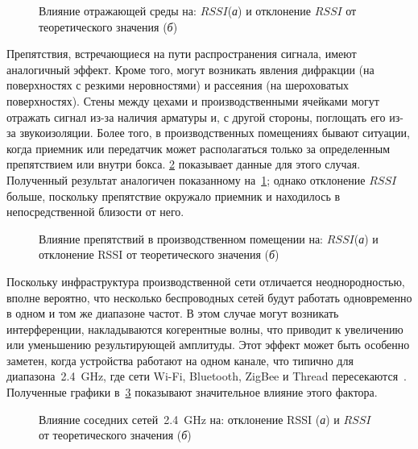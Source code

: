 \begin{figure} [tb]
	\caption{Влияние отражающей среды на: $RSSI$(\textit{а}) и отклонение $RSSI$ от теоретического значения (\textit{б})}
	\label{ch-3/fig-5}
\end{figure}

Препятствия, встречающиеся на пути распространения сигнала, имеют аналогичный эффект. Кроме того, могут возникать явления дифракции (на поверхностях с резкими неровностями) и рассеяния (на шероховатых поверхностях). Стены между цехами и производственными ячейками могут отражать сигнал из-за наличия арматуры и, с другой стороны, поглощать его из-за звукоизоляции. Более того, в производственных помещениях бывают ситуации, когда приемник или передатчик может располагаться только за определенным препятствием или внутри бокса. \cref{ch-3/fig-6} показывает данные для этого случая. Полученный результат аналогичен показанному на~\cref{ch-3/fig-5}; однако отклонение $RSSI$ больше, поскольку препятствие окружало приемник и находилось в непосредственной близости от него.

\begin{figure} [tb]
	\caption{Влияние препятствий в производственном помещении на: $RSSI$(\textit{а}) и отклонение RSSI от теоретического значения (\textit{б})}
	\label{ch-3/fig-6}
\end{figure}

Поскольку инфраструктура производственной сети отличается неоднородностью, вполне вероятно, что несколько беспроводных сетей будут работать одновременно в одном и том же диапазоне частот. В этом случае могут возникать интерференции, накладываются когерентные волны, что приводит к увеличению или уменьшению результирующей амплитуды. Этот эффект может быть особенно заметен, когда устройства работают на одном канале, что типично для диапазона~\SI{2,4}{\giga \hertz}, где сети Wi-Fi, Bluetooth, ZigBee и Thread пересекаются~\cite{016461}. Полученные графики в~\cref{ch-3/fig-7} показывают значительное влияние этого фактора.

\begin{figure} [htb]
	\caption{Влияние соседних сетей~\SI{2,4}{\giga \hertz} на: отклонение RSSI (\textit{а}) и $RSSI$ от теоретического значения (\textit{б})}
	\label{ch-3/fig-7}
\end{figure}

